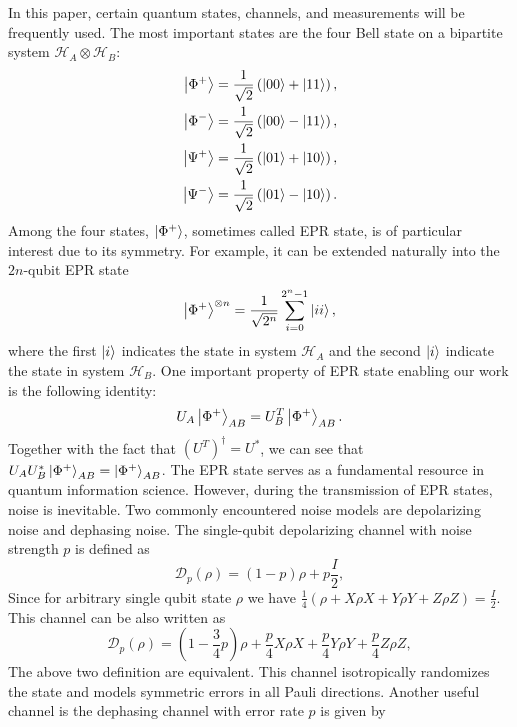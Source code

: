 \documentclass[onecolumn,prx,longbibliography,nofootinbib, superscriptaddress]{revtex4-2}
\theoremstyle{recap}
\begin{document}
In this paper, certain quantum states, channels, and measurements will be frequently used. The most important states are the four Bell state on a bipartite system $\mathcal{H}_A\otimes\mathcal{H}_B$:
\begin{equation}
\begin{split}
\ket{\Phi^+} = \frac{1}{\sqrt{2}}\left( \ket{00} + \ket{11} \right),\\
\ket{\Phi^-} = \frac{1}{\sqrt{2}}\left( \ket{00} - \ket{11} \right),\\
\ket{\Psi^+} = \frac{1}{\sqrt{2}}\left( \ket{01} + \ket{10} \right),\\
\ket{\Psi^-} = \frac{1}{\sqrt{2}}\left( \ket{01} - \ket{10} \right).
\end{split}
\end{equation}
Among the four states, $\ket{\Phi^+}$, sometimes called EPR state, is of particular interest due to its symmetry. For example, it can be extended naturally into the $2n$-qubit EPR state
\begin{equation}
\ket{\Phi^+}^{\otimes n} = \frac{1}{\sqrt{2^n}}\sum_{i=0}^{2^{n}-1} \ket{ii},
\end{equation}
where the first $\ket{i}$ indicates the state in system $\mathcal{H}_A$ and the second $\ket{i}$ indicate the state in system $\mathcal{H}_B$. One important property of EPR state enabling our work is the following identity: 
\begin{equation}\label{eq:useful_identity}
    U_A\ket{\Phi^+}_{AB}=U_B^T\ket{\Phi^+}_{AB}.
\end{equation}
Together with the fact that $(U^T)^{\dagger}=U^{*}$, we can see that $U_AU_B^*\ket{\Phi^+}_{AB}=\ket{\Phi^+}_{AB}$. The EPR state serves as a fundamental resource in quantum information science. However, during the transmission of EPR states, noise is inevitable. Two commonly encountered noise models are depolarizing noise and dephasing noise. The single-qubit depolarizing channel with noise strength $p$ is defined as
\begin{equation}
\mathcal{D}_p(\rho)=(1-p)\rho+p\frac{I}{2},
\end{equation}
Since for arbitrary single qubit state $\rho$ we have $\frac{1}{4}(\rho+X\rho X+Y\rho Y+Z\rho Z)=\frac{I}{2}$. This channel can be also written as
\begin{equation}
\mathcal{D}_p(\rho)=(1-\frac{3}{4}p)\rho+\frac{p}{4}X\rho X+\frac{p}{4}Y\rho Y+\frac{p}{4}Z\rho Z,
\end{equation}
The above two definition are equivalent. This channel isotropically randomizes the state and models symmetric errors in all Pauli directions. Another useful channel is the dephasing channel with error rate $p$ is given by
\end{document}
